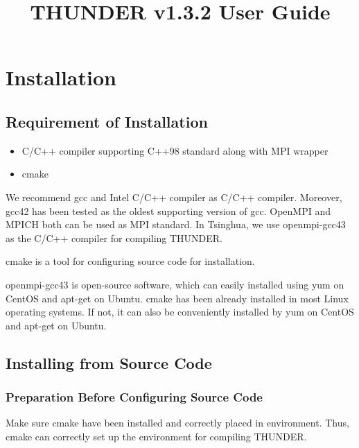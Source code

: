 \documentclass{article}
\begin{document}
    \title{THUNDER v1.3.2 User Guide}
    \maketitle
    
    \section{Installation}
    
        \subsection{Requirement of Installation}
        
            \begin{itemize}
                \item C/C++ compiler supporting C++98 standard along with MPI wrapper
                \item \textsf{cmake}
            \end{itemize}
            
            We recommend \textsf{gcc} and Intel C/C++ compiler as C/C++ compiler. Moreover, \textsf{gcc42} has been tested as the oldest supporting version of \textsf{gcc}. OpenMPI and MPICH both can be used as MPI standard. In Tsinghua, we use \textsf{openmpi-gcc43} as the C/C++ compiler for compiling THUNDER.
            
            \textsf{cmake} is a tool for configuring source code for installation.
            
            \textsf{openmpi-gcc43} is open-source software, which can easily installed using \textsf{yum} on CentOS and \textsf{apt-get} on Ubuntu. \textsf{cmake} has been already installed in most Linux operating systems. If not, it can also be conveniently installed by \textsf{yum} on CentOS and \textsf{apt-get} on Ubuntu.
        
        \subsection{Installing from Source Code}
        
            \subsubsection{Preparation Before Configuring Source Code}
            
                Make sure \textsf{cmake} have been installed and correctly placed in environment. Thus, \textsf{cmake} can correctly set up the environment for compiling THUNDER.
        
\end{document}
